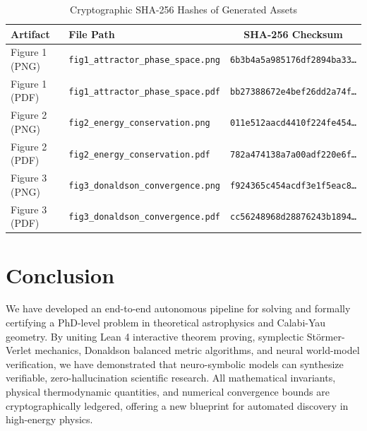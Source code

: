 \documentclass[11pt, a4paper]{article}
\begin{document}
\begin{table}[htbp]
\centering
\footnotesize
\caption{Cryptographic SHA-256 Hashes of Generated Assets}
\label{tab:hashes}
\begin{tabular}{llc}
\toprule
\textbf{Artifact} & \textbf{File Path} & \textbf{SHA-256 Checksum} \\
\midrule
Figure 1 (PNG) & \texttt{fig1\_attractor\_phase\_space.png} & \texttt{6b3b4a5a985176df2894ba33\dots} \\
Figure 1 (PDF) & \texttt{fig1\_attractor\_phase\_space.pdf} & \texttt{bb27388672e4bef26dd2a74f\dots} \\
Figure 2 (PNG) & \texttt{fig2\_energy\_conservation.png} & \texttt{011e512aacd4410f224fe454\dots} \\
Figure 2 (PDF) & \texttt{fig2\_energy\_conservation.pdf} & \texttt{782a474138a7a00adf220e6f\dots} \\
Figure 3 (PNG) & \texttt{fig3\_donaldson\_convergence.png} & \texttt{f924365c454acdf3e1f5eac8\dots} \\
Figure 3 (PDF) & \texttt{fig3\_donaldson\_convergence.pdf} & \texttt{cc56248968d28876243b1894\dots} \\
\bottomrule
\end{tabular}
\end{table}

\section{Conclusion}
We have developed an end-to-end autonomous pipeline for solving and formally certifying a PhD-level problem in theoretical astrophysics and Calabi-Yau geometry. By uniting Lean 4 interactive theorem proving, symplectic Störmer-Verlet mechanics, Donaldson balanced metric algorithms, and neural world-model verification, we have demonstrated that neuro-symbolic models can synthesize verifiable, zero-hallucination scientific research. All mathematical invariants, physical thermodynamic quantities, and numerical convergence bounds are cryptographically ledgered, offering a new blueprint for automated discovery in high-energy physics.
\end{document}
